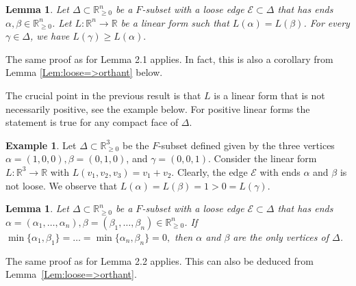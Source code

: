 \documentclass[11pt]{amsart}
\theoremstyle{plain}
\newtheorem{Lem}[Thm]{Lemma}
\theoremstyle{definition}
\newtheorem{Ex}[Thm]{Example}
\numberwithin{equation}{section}
\renewcommand{\a}{\alpha}
\renewcommand{\b}{\beta}
\newcommand{\g}{\gamma}
\renewcommand{\d}{\delta}
\newcommand{\D}{\Delta}
\newcommand{\RR}{\mathbb R}
\newcommand{\ZZ}{{\mathbb Z}}
\newcommand{\cE}{\mathcal{E}}
\newcommand{\Edge}{\cE}
\newcommand{\gqz}{{\geq 0}}
\renewcommand{\(}{(\!(}
\renewcommand{\)}{)\!)}
\newcommand{\red}[1]{\textcolor{red}{#1}}
\begin{document}
\begin{Lem}
	\label{Lem:L(a)=L(b)=>L(g)>=L(a)}
	Let $ \Delta \subset \RR^n_\gqz $ be a $ F $-subset
	with a loose edge $ \Edge \subset \D $ that has ends $ \a, \b \in \RR^n_\gqz $.
	Let $ L : \RR^n \to \RR $ be a linear form such that $ L(\a) = L(\b) $. 
	For every $ \g \in \D $, we have
	$
		L(\g) \geq L(\a).
	$ 
\end{Lem}

\noindent 
The same proof as for \cite{GH} Lemma 2.1 applies.
In fact, this is also a corollary from Lemma \ref{Lem:loose=>orthant} below.

The crucial point in the previous result is that $ L $ is a linear form that is not necessarily positive, see the example below.
For positive linear forms the statement is true for any compact face of $ \D $. 

\begin{Ex}
	Let $ \D \subset \RR^3_\gqz $ be the $ F $-subset defined given by the three vertices 
	$ \a = (1,0,0), \b = (0,1,0) $, and $ \g = (0,0,1) $.
	Consider the linear form $ L : \RR^3 \to \RR $ with $ L (v_1,v_2, v_3) = v_1 + v_2 $.
	Clearly, the edge $ \Edge $ with ends $ \a $ and $ \b $ is not loose.
	We observe that
	$
		L(\a) = L(\b) = 1 > 0 = L (\g).
	$
\end{Ex}

\begin{Lem}
	\label{Lem_2.2}
	Let $ \Delta \subset \RR^n_\gqz $ be a $ F $-subset
	with a loose edge $ \Edge \subset \D $ that has ends $ \a  =(\a_1, \ldots, \a_n), \b = (\b_1, \ldots, \b_n) \in \RR^n_\gqz $.
	If 
	$
		\min\{ \a_1, \b_1 \} = \ldots = \min\{ \a_n, \b_n \} = 0,
	$
	then $ \a $ and $ \b $ are the only vertices of $ \D $.
\end{Lem}

\noindent 
The same proof as for \cite{GH} Lemma 2.2 applies.
This can also be deduced from Lemma~\ref{Lem:loose=>orthant}.

\iffalse 
\begin{Lem}[\cite{GH} Lemma 2.3]
	\red{Maybe, I can avoid this by talking about projections}
	Let $ \d \in \ZZ^n $
	be a point with at least one positive and at least one negative coordinate.
	There exists a basis $ \xi_1, \ldots, \xi_n $  of the vector space $ \RR^n $ such that
	\[
		\begin{array}{ll}
		\bullet \ \xi \in \ZZ_\gqz^n,	&
		\mbox{ for all } i \in \{ 1, \ldots, n \} \mbox{ and}
		\\
		\bullet \ \langle \xi_i , \d \rangle = 0, 
		&
		\mbox{ for all } i \in \{ 1, \ldots, n-1 \}.		
		\end{array}
	\]  
\end{Lem}
\fi 
\end{document}
